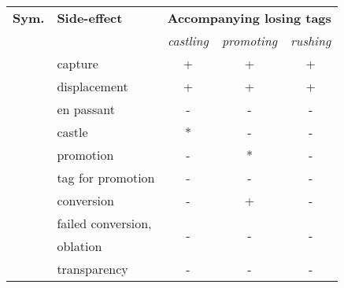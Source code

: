 \begin{table}[!h]
\centering
\begin{tabular}{ rlccc }
\toprule %
\textbf{Sym.}               & \textbf{Side-effect}  & \multicolumn{3}{c}{ \textbf{Accompanying losing tags} }              \\
                                                    \cmidrule{3-5} %
                            &                       & \emph{castling}      & \emph{promoting}      & \emph{rushing}        \\
\midrule %
\alg{*}                     & capture               & +                    & +                     & +                     \\
\alg{<}                     & displacement          & +                    & +                     & +                     \\
\alg{:}                     & en passant            & -                    & -                     & -                     \\
\alg{\&}                    & castle                & *                    & -                     & -                     \\
\alg{=}                     & promotion             & -                    & *                     & -                     \\
\alg{=}                     & tag for promotion     & -                    & -                     & -                     \\
\alg{\%}                    & conversion            & -                    & +                     & -                     \\
\cmidrule{1-5} %
\multirow{2}{*}{\alg{\%\%}} & failed conversion,    & \multirow{2}{*}{-}   & \multirow{2}{*}{-}    & \multirow{2}{*}{-}    \\
                            & oblation              &                      &                       &                       \\
\cmidrule{1-5} %
\alg{\^{}}                  & transparency          & -                    & -                     & -                     \\

\end{tabular}
\end{table}
